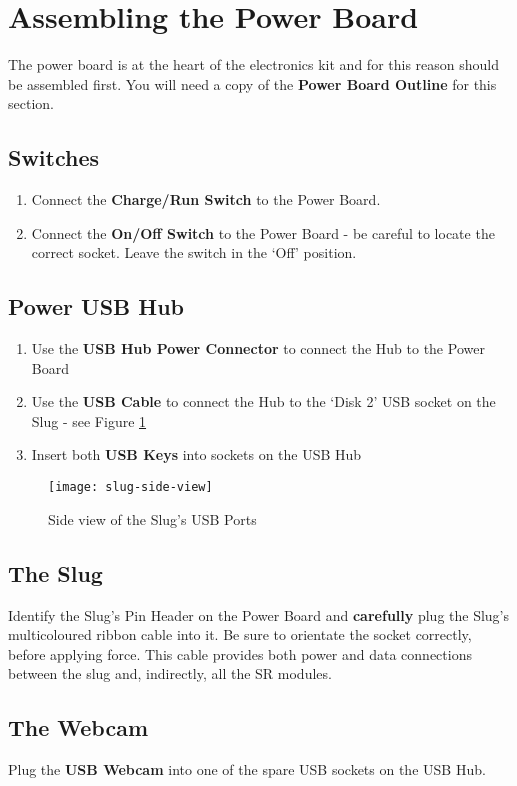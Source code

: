 
\section{Assembling the Power Board}
The power board is at the heart of the electronics kit and for this reason should be assembled first. You will need a copy of the \textbf{Power Board Outline} for this section.

\subsection{Switches}
\begin{enumerate}
\item Connect the \textbf{Charge/Run Switch} to the Power Board. 
\item Connect the \textbf{On/Off Switch} to the Power Board - be careful to locate the correct socket. Leave the switch in the `Off' position.
\end{enumerate}

\subsection{Power USB Hub}
\begin{enumerate}
\item Use the \textbf{USB Hub Power Connector} to connect the Hub to the Power Board
\item Use the \textbf{USB Cable} to connect the Hub to the `Disk 2' USB socket on the Slug - see Figure \ref{fig:slug-side}
\item Insert both \textbf{USB Keys} into sockets on the USB Hub
\end{enumerate}

\begin{figure}[h!]
\center
\texttt{[image: slug-side-view]}
\caption{Side view of the Slug's USB Ports}
\label{fig:slug-side}
\end{figure}


\subsection{The Slug}
Identify the Slug's Pin Header on the Power Board and \textbf{carefully} plug the Slug's multicoloured ribbon cable into it. Be sure to orientate the socket correctly, before applying force. This cable provides both power and data connections between the slug and, indirectly, all the SR modules.

\subsection{The Webcam}
Plug the \textbf{USB Webcam} into one of the spare USB sockets on the USB Hub.

